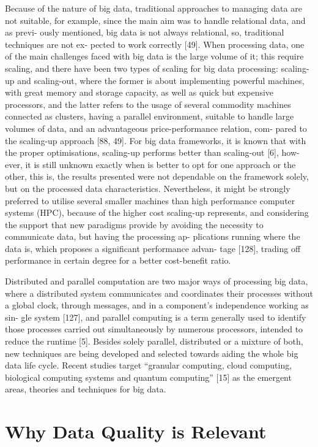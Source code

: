 Because of the nature of big data, traditional approaches to managing data are not
suitable, for example, since the main aim was to handle relational data, and as previ-
ously mentioned, big data is not always relational, so, traditional techniques are not ex-
pected to work correctly [49]. When processing data, one of the main challenges faced
with big data is the large volume of it; this require scaling, and there have been two
types of scaling for big data processing: scaling-up and scaling-out, where the former
is about implementing powerful machines, with great memory and storage capacity,
as well as quick but expensive processors, and the latter refers to the usage of several
commodity machines connected as clusters, having a parallel environment, suitable to
handle large volumes of data, and an advantageous price-performance relation, com-
pared to the scaling-up approach [88, 49]. For big data frameworks, it is known that with the proper optimisations, scaling-up performs better than scaling-out [6], how-
ever, it is still unknown exactly when is better to opt for one approach or the other,
this is, the results presented were not dependable on the framework solely, but on the
processed data characteristics. Nevertheless, it might be strongly preferred to utilise
several smaller machines than high performance computer systems (HPC), because of
the higher cost scaling-up represents, and considering the support that new paradigms
provide by avoiding the necessity to communicate data, but having the processing ap-
plications running where the data is, which proposes a significant performance advan-
tage [128], trading off performance in certain degree for a better cost-benefit ratio.

Distributed and parallel computation are two major ways of processing big data,
where a distributed system communicates and coordinates their processes without a
global clock, through messages, and in a component’s independence working as sin-
gle system [127], and parallel computing is a term generally used to identify those
processes carried out simultaneously by numerous processors, intended to reduce the
runtime [5]. Besides solely parallel, distributed or a mixture of both, new techniques
are being developed and selected towards aiding the whole big data life cycle. Recent
studies target “granular computing, cloud computing, biological computing systems
and quantum computing” [15] as the emergent areas, theories and techniques for big
data.

\section{Why Data Quality is Relevant}


